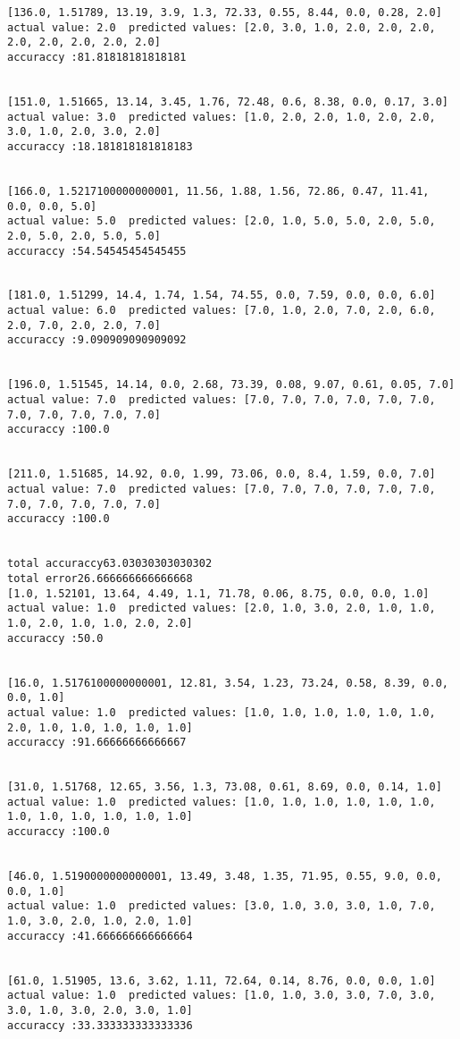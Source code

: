 \documentclass[11pt]{article}
\begin{document}
\begin{Verbatim}[commandchars=\\\{\}]
[136.0, 1.51789, 13.19, 3.9, 1.3, 72.33, 0.55, 8.44, 0.0, 0.28, 2.0]
actual value: 2.0  predicted values: [2.0, 3.0, 1.0, 2.0, 2.0, 2.0, 2.0, 2.0, 2.0, 2.0, 2.0]
accuraccy :81.81818181818181


[151.0, 1.51665, 13.14, 3.45, 1.76, 72.48, 0.6, 8.38, 0.0, 0.17, 3.0]
actual value: 3.0  predicted values: [1.0, 2.0, 2.0, 1.0, 2.0, 2.0, 3.0, 1.0, 2.0, 3.0, 2.0]
accuraccy :18.181818181818183


[166.0, 1.5217100000000001, 11.56, 1.88, 1.56, 72.86, 0.47, 11.41, 0.0, 0.0, 5.0]
actual value: 5.0  predicted values: [2.0, 1.0, 5.0, 5.0, 2.0, 5.0, 2.0, 5.0, 2.0, 5.0, 5.0]
accuraccy :54.54545454545455


[181.0, 1.51299, 14.4, 1.74, 1.54, 74.55, 0.0, 7.59, 0.0, 0.0, 6.0]
actual value: 6.0  predicted values: [7.0, 1.0, 2.0, 7.0, 2.0, 6.0, 2.0, 7.0, 2.0, 2.0, 7.0]
accuraccy :9.090909090909092


[196.0, 1.51545, 14.14, 0.0, 2.68, 73.39, 0.08, 9.07, 0.61, 0.05, 7.0]
actual value: 7.0  predicted values: [7.0, 7.0, 7.0, 7.0, 7.0, 7.0, 7.0, 7.0, 7.0, 7.0, 7.0]
accuraccy :100.0


[211.0, 1.51685, 14.92, 0.0, 1.99, 73.06, 0.0, 8.4, 1.59, 0.0, 7.0]
actual value: 7.0  predicted values: [7.0, 7.0, 7.0, 7.0, 7.0, 7.0, 7.0, 7.0, 7.0, 7.0, 7.0]
accuraccy :100.0


total accuraccy63.03030303030302
total error26.666666666666668
[1.0, 1.52101, 13.64, 4.49, 1.1, 71.78, 0.06, 8.75, 0.0, 0.0, 1.0]
actual value: 1.0  predicted values: [2.0, 1.0, 3.0, 2.0, 1.0, 1.0, 1.0, 2.0, 1.0, 1.0, 2.0, 2.0]
accuraccy :50.0


[16.0, 1.5176100000000001, 12.81, 3.54, 1.23, 73.24, 0.58, 8.39, 0.0, 0.0, 1.0]
actual value: 1.0  predicted values: [1.0, 1.0, 1.0, 1.0, 1.0, 1.0, 2.0, 1.0, 1.0, 1.0, 1.0, 1.0]
accuraccy :91.66666666666667


[31.0, 1.51768, 12.65, 3.56, 1.3, 73.08, 0.61, 8.69, 0.0, 0.14, 1.0]
actual value: 1.0  predicted values: [1.0, 1.0, 1.0, 1.0, 1.0, 1.0, 1.0, 1.0, 1.0, 1.0, 1.0, 1.0]
accuraccy :100.0


[46.0, 1.5190000000000001, 13.49, 3.48, 1.35, 71.95, 0.55, 9.0, 0.0, 0.0, 1.0]
actual value: 1.0  predicted values: [3.0, 1.0, 3.0, 3.0, 1.0, 7.0, 1.0, 3.0, 2.0, 1.0, 2.0, 1.0]
accuraccy :41.666666666666664


[61.0, 1.51905, 13.6, 3.62, 1.11, 72.64, 0.14, 8.76, 0.0, 0.0, 1.0]
actual value: 1.0  predicted values: [1.0, 1.0, 3.0, 3.0, 7.0, 3.0, 3.0, 1.0, 3.0, 2.0, 3.0, 1.0]
accuraccy :33.333333333333336



\end{Verbatim}
\end{document}

